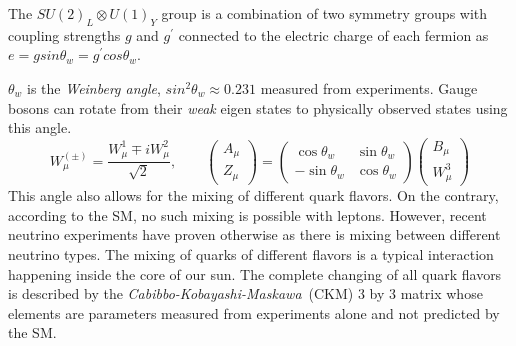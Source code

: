 The $SU(2)_{L} \otimes U(1)_{Y}$ group is a combination of two symmetry groups with coupling strengths $g$ and $g^{\prime}$ connected to the electric charge of each fermion as $e = g sin \theta_{w} = g^{\prime} cos \theta_{w}$.


$\theta_{w}$ is the \textit{Weinberg angle}, $sin^{2}\theta_{w} \approx 0.231$ measured from experiments.
Gauge bosons can rotate from their \textit{weak} eigen states to physically observed states using this angle.
\begin{equation}
 W^{(\pm)}_{\mu} = \frac{W^{1}_{\mu} \mp i W^{2}_{\mu}}{\sqrt{2}}, \quad \quad 
 {\begin{pmatrix} A_{\mu} \\ Z_{\mu}  \end{pmatrix} } = {\begin{pmatrix}  \cos{\theta_{w}} & \sin{\theta_{w}} \\ -\sin{\theta_{w}} & \cos{\theta_{w}}   \end{pmatrix}}  {\begin{pmatrix} B_{\mu} \\ W^{3}_{\mu} \end{pmatrix} }
\end{equation}
This angle also allows for the mixing of different quark flavors. On the contrary, according to the SM, no such mixing is possible with leptons. However, recent neutrino experiments have proven otherwise as there is mixing between different neutrino types. The mixing of quarks of different flavors is a typical interaction happening inside the core of our sun. The complete changing of all quark flavors is described by the \textit{Cabibbo-Kobayashi-Maskawa}~(CKM) 3 by 3 matrix whose elements are parameters measured from experiments alone and not predicted by the SM.

